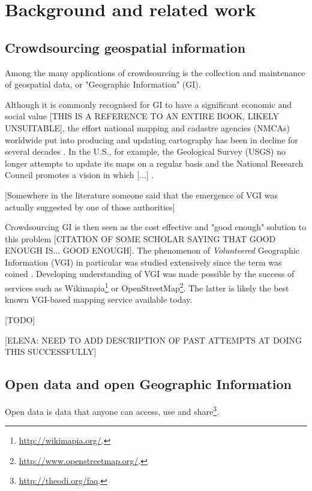 \section{Background and related work}

\subsection{Crowdsourcing geospatial information}

    Among the many applications of crowdsourcing is the collection and maintenance of geospatial data, or "Geographic Information" (GI).
    
    Although it is commonly recognised for GI to have a significant economic and social value \cite{Sui:2012uf}[THIS IS A REFERENCE TO AN ENTIRE BOOK, LIKELY UNSUITABLE], the effort national mapping and cadastre agencies (NMCAs) worldwide put into producing and updating cartography has been in decline for several decades \cite{ESTES:1994vz}. In the U.S., for example, the Geological Survey (USGS) no longer attempts to update its maps on a regular basis and the National Research Council promotes a vision in which {[}...{]} \cite{Committee:1993vp}.
    
    {[}Somewhere in the literature someone said that the emergence of VGI was actually suggested by one of those authorities{]}
    
    Crowdsourcing GI is then seen as the cost effective and "good enough" solution to this problem [CITATION OF SOME SCHOLAR SAYING THAT GOOD ENOUGH IS... GOOD ENOUGH]. The phenomenon of {\it Volunteered} Geographic Information (VGI) in particular was studied extensively since the term was coined \cite{Goodchild:2007vt}. Developing understanding of VGI was made possible by the success of services such as Wikimapia\footnote{\url{http://wikimapia.org/}.} or OpenStreetMap\footnote{\url{http://www.openstreetmap.org/}.}. The latter is likely the best known VGI-based mapping service available today.

    [TODO]

    [ELENA: NEED TO ADD DESCRIPTION OF PAST ATTEMPTS AT DOING THIS SUCCESSFULLY]

\subsection{Open data and open Geographic Information}

    Open data is data that anyone can access, use and share\footnote{\url{http://theodi.org/faq}.}. 
    
